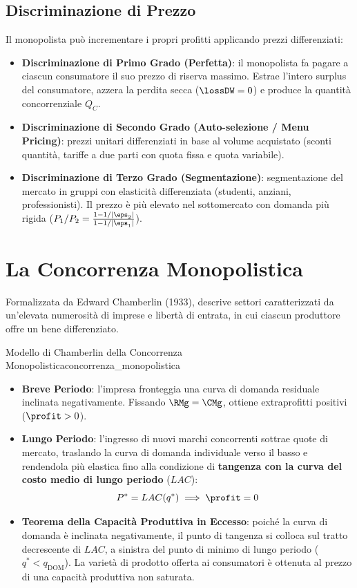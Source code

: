 \subsection{Discriminazione di Prezzo}
Il monopolista può incrementare i propri profitti applicando prezzi differenziati:
\begin{itemize}
    \item \textbf{Discriminazione di Primo Grado (Perfetta)}: il monopolista fa pagare a ciascun consumatore il suo prezzo di riserva massimo. Estrae l'intero surplus del consumatore, azzera la perdita secca ($\lossDW = 0$) e produce la quantità concorrenziale $Q_C$.
    \item \textbf{Discriminazione di Secondo Grado (Auto-selezione / Menu Pricing)}: prezzi unitari differenziati in base al volume acquistato (sconti quantità, tariffe a due parti con quota fissa e quota variabile).
    \item \textbf{Discriminazione di Terzo Grado (Segmentazione)}: segmentazione del mercato in gruppi con elasticità differenziata (studenti, anziani, professionisti). Il prezzo è più elevato nel sottomercato con domanda più rigida ($P_1/P_2 = \frac{1 - 1/|\eps_2|}{1 - 1/|\eps_1|}$).
\end{itemize}

\section{La Concorrenza Monopolistica}

Formalizzata da Edward Chamberlin (1933), descrive settori caratterizzati da un'elevata numerosità di imprese e libertà di entrata, in cui ciascun produttore offre un bene differenziato.

\begin{modello}{Modello di Chamberlin della Concorrenza Monopolistica}{concorrenza_monopolistica}
\begin{itemize}
    \item \textbf{Breve Periodo}: l'impresa fronteggia una curva di domanda residuale inclinata negativamente. Fissando $\RMg = \CMg$, ottiene extraprofitti positivi ($\profit > 0$).
    \item \textbf{Lungo Periodo}: l'ingresso di nuovi marchi concorrenti sottrae quote di mercato, traslando la curva di domanda individuale verso il basso e rendendola più elastica fino alla condizione di \textbf{tangenza con la curva del costo medio di lungo periodo} ($LAC$):
    \begin{equation}
        P^* = LAC(q^*) \implies \profit = 0
    \end{equation}
    \item \textbf{Teorema della Capacità Produttiva in Eccesso}: poiché la curva di domanda è inclinata negativamente, il punto di tangenza si colloca sul tratto decrescente di $LAC$, a sinistra del punto di minimo di lungo periodo ($q^* < q_{\text{DOM}}$). La varietà di prodotto offerta ai consumatori è ottenuta al prezzo di una capacità produttiva non saturata.
\end{itemize}
\end{modello}

